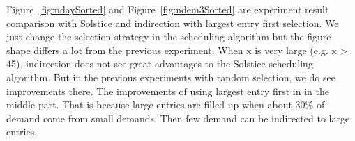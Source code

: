 Figure~\ref{fig:ndaySorted} and Figure~\ref{fig:ndem3Sorted} are experiment result comparison with Solstice and indirection with largest entry first selection. We just change the selection strategy in the scheduling algorithm but the figure shape differs a lot from the previous experiment. When x is very large (e.g. x > 45), indirection does not see great advantages to the Solstice scheduling algorithm. But in the previous experiments with random selection, we do see improvements there. The improvements of using largest entry first in in the middle part. That is because large entries are filled up when about 30\% of demand come from small demands. Then few demand can be indirected to large entries. 

